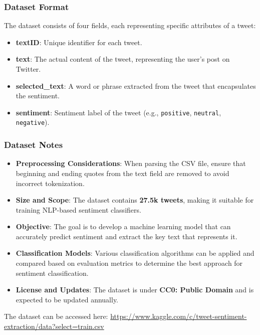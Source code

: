 \subsubsection{Dataset Format}

The dataset consists of four fields, each representing specific attributes of a tweet:

\begin{itemize}
    \item \textbf{textID}: Unique identifier for each tweet.
    \item \textbf{text}: The actual content of the tweet, representing the user’s post on Twitter.
    \item \textbf{selected\_text}: A word or phrase extracted from the tweet that encapsulates the sentiment.
    \item \textbf{sentiment}: Sentiment label of the tweet (e.g., \texttt{positive}, \texttt{neutral}, \texttt{negative}).
\end{itemize}

\subsubsection{Dataset Notes}

\begin{itemize}
    \item \textbf{Preprocessing Considerations}: When parsing the CSV file, ensure that beginning and ending quotes from the text field are removed to avoid incorrect tokenization.
    \item \textbf{Size and Scope}: The dataset contains \textbf{27.5k tweets}, making it suitable for training NLP-based sentiment classifiers.
    \item \textbf{Objective}: The goal is to develop a machine learning model that can accurately predict sentiment and extract the key text that represents it.
    \item \textbf{Classification Models}: Various classification algorithms can be applied and compared based on evaluation metrics to determine the best approach for sentiment classification.
    \item \textbf{License and Updates}: The dataset is under \textbf{CC0: Public Domain} and is expected to be updated annually.
\end{itemize}

The dataset can be accessed here: \url{https://www.kaggle.com/c/tweet-sentiment-extraction/data?select=train.csv}

